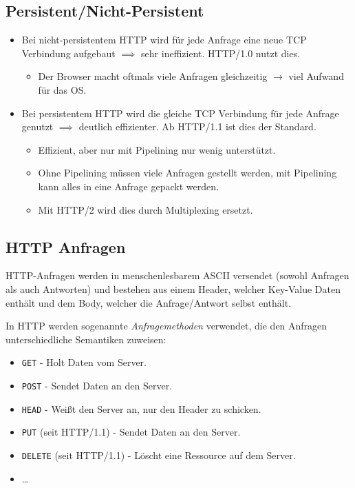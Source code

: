         \subsection{Persistent/Nicht-Persistent} %
            \begin{itemize}
            	\item Bei nicht-persistentem HTTP wird für jede Anfrage eine neue TCP Verbindung aufgebaut \(\implies\) sehr ineffizient. HTTP/1.0 nutzt dies.
	            	\begin{itemize}
	            		\item Der Browser macht oftmals viele Anfragen gleichzeitig \(\rightarrow\) viel Aufwand für das OS.
	            	\end{itemize}
            	\item Bei persistentem HTTP wird die gleiche TCP Verbindung für jede Anfrage genutzt \(\implies\) deutlich effizienter. Ab HTTP/1.1 ist dies der Standard.
	            	\begin{itemize}
	            		\item Effizient, aber nur mit Pipelining nur wenig unterstützt.
	            		\item Ohne Pipelining müssen viele Anfragen gestellt werden, mit Pipelining kann alles in eine Anfrage gepackt werden.
	            		\item Mit HTTP/2 wird dies durch Multiplexing ersetzt.
	            	\end{itemize}
            \end{itemize}

        \subsection{HTTP Anfragen}
            HTTP-Anfragen werden in menschenlesbarem ASCII versendet (sowohl Anfragen als auch Antworten) und bestehen aus einem Header, welcher Key-Value Daten enthält und dem Body, welcher die Anfrage/Antwort selbst enthält.
            
            In HTTP werden sogenannte \textit{Anfragemethoden} verwendet, die den Anfragen unterschiedliche Semantiken zuweisen:
            \begin{itemize}
            	\item \texttt{GET} - Holt Daten vom Server.
            	\item \texttt{POST} - Sendet Daten an den Server.
            	\item \texttt{HEAD} - Weißt den Server an, nur den Header zu schicken.
            	\item \texttt{PUT} (seit HTTP/1.1) - Sendet Daten an den Server.
            	\item \texttt{DELETE} (seit HTTP/1.1) - Löscht eine Ressource auf dem Server.
            	\item \dots
            \end{itemize}
            
